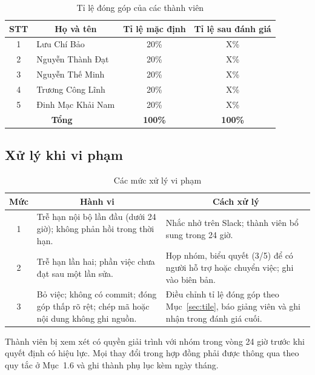 \documentclass[a4paper]{article}
\makeatletter
\newcommand{\tvA}{{Lưu Chí Bảo}} \newcommand{\mssvA}{{25520137}} \newcommand{\mailA}{{25520137}@gm.uit.edu.vn}
\newcommand{\tvB}{{Nguyễn Thành Đạt}} \newcommand{\mssvB}{{25520288}} \newcommand{\mailB}{{25520288}@gm.uit.edu.vn}
\newcommand{\tvC}{{Nguyễn Thế Minh}} \newcommand{\mssvC}{{25521124}} \newcommand{\mailC}{{25521124}@gm.uit.edu.vn}
\newcommand{\tvD}{{Trương Công Lĩnh}} \newcommand{\mssvD}{{25521011}} \newcommand{\mailD}{{25521011}@gm.uit.edu.vn}
\newcommand{\tvE}{{Đinh Mạc Khải Nam}} \newcommand{\mssvE}{{25521152}} \newcommand{\mailE}{{25521152}@gm.uit.edu.vn}
\makeatother
\begin{document}
\begin{table}[H]
\centering

\begin{tabularx}{\linewidth}{|c|X|c|c|}
\hline
\textbf{STT} & \multicolumn{1}{c|}{\textbf{Họ và tên}} & \textbf{Tỉ lệ mặc định} & \textbf{Tỉ lệ sau đánh giá} \\ \hline
1 & \tvA & 20\% & X\% \\ \hline
2 & \tvB & 20\% & X\% \\ \hline
3 & \tvC & 20\% & X\% \\ \hline
4 & \tvD & 20\% & X\% \\ \hline
5 & \tvE & 20\% & X\% \\ \hline
\multicolumn{2}{|c|}{\textbf{Tổng}} & \textbf{100\%} & \textbf{100\%} \\ \hline
\end{tabularx}
\vspace{8pt}
\caption{Tỉ lệ đóng góp của các thành viên}
\label{tab:tiledonggop}
\end{table}

\subsection{Xử lý khi vi phạm}
\begin{table}[H]
\centering

\begin{tabularx}{\linewidth}{|c|X|X|}
\hline
\textbf{Mức} & \multicolumn{1}{c|}{\textbf{Hành vi}} & \multicolumn{1}{c|}{\textbf{Cách xử lý}} \\ \hline
1 & Trễ hạn nội bộ lần đầu (dưới 24 giờ); không phản hồi trong thời hạn. & Nhắc nhở trên Slack; thành viên bổ sung trong 24 giờ. \\ \hline
2 & Trễ hạn lần hai; phần việc chưa đạt sau một lần sửa. & Họp nhóm, biểu quyết (3/5) để có người hỗ trợ hoặc chuyển việc; ghi vào biên bản. \\ \hline
3 & Bỏ việc; không có commit; đóng góp thấp rõ rệt; chép mã hoặc nội dung không ghi nguồn. & Điều chỉnh tỉ lệ đóng góp theo Mục~\ref{sec:tile}, báo giảng viên và ghi nhận trong đánh giá cuối. \\ \hline
\end{tabularx}
\vspace{8pt}
\caption{Các mức xử lý vi phạm}
\label{tab:vipham}
\end{table}
Thành viên bị xem xét có quyền giải trình với nhóm trong vòng 24 giờ trước khi quyết định có hiệu lực. Mọi thay đổi trong hợp đồng phải được thông qua theo quy tắc ở Mục~1.6 và ghi thành phụ lục kèm ngày tháng.
\end{document}
